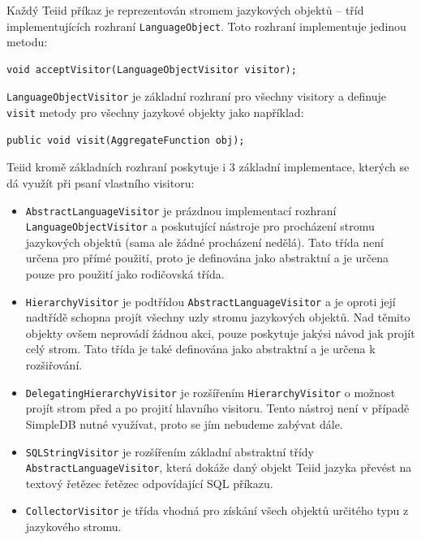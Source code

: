 \documentclass[oneside,12pt,final]{fithesis2}
\begin{document}
Každý Teiid příkaz je reprezentován stromem jazykových objektů -- tříd implementujících rozhraní \texttt{LanguageObject}. Toto rozhraní implementuje jedinou metodu: 
\begin{Verbatim}[fontsize=\small]
void acceptVisitor(LanguageObjectVisitor visitor);
\end{Verbatim}
\texttt{LanguageObjectVisitor} je základní rozhraní pro všechny visitory a definuje \texttt{visit} metody pro všechny jazykové objekty jako například:
\begin{Verbatim}[fontsize=\small]
public void visit(AggregateFunction obj);
\end{Verbatim}
Teiid kromě základních rozhraní poskytuje i 3 základní implementace, kterých se dá využít při psaní vlastního visitoru:
\begin{itemize}
 \item \texttt{AbstractLanguageVisitor} je prázdnou implementací rozhraní \texttt{Language\allowbreak ObjectVisitor} a poskutující nástroje pro procházení stromu jazykových objektů (sama ale žádné procházení nedělá). Tato třída není určena pro přímé použití, proto je definována jako abstraktní a je určena pouze pro použití jako rodičovská třída.
 \item \texttt{HierarchyVisitor} je podtřídou \texttt{AbstractLanguageVisitor} a je oproti její nadtřídě schopna projít všechny uzly stromu jazykových objektů. Nad těmito objekty ovšem neprovádí žádnou akci, pouze poskytuje jakýsi návod jak projít celý strom. Tato třída je také definována jako abstraktní a je určena k rozšiřování.
 \item \texttt{DelegatingHierarchyVisitor} je rozšířením \texttt{HierarchyVisitor} o možnost projít strom před a po projití hlavního visitoru. Tento nástroj není v případě SimpleDB nutné využívat, proto se jím nebudeme zabývat dále.
 \item \texttt{SQLStringVisitor} je rozšířením základní abstraktní třídy \texttt{AbstractLanguageVisitor}, která dokáže daný objekt Teiid jazyka převést na textový řetězec řetězec odpovídající SQL příkazu.
 \item \texttt{CollectorVisitor} je třída vhodná pro získání všech objektů určitého typu z jazykového stromu.
\end{itemize}
\end{document}

